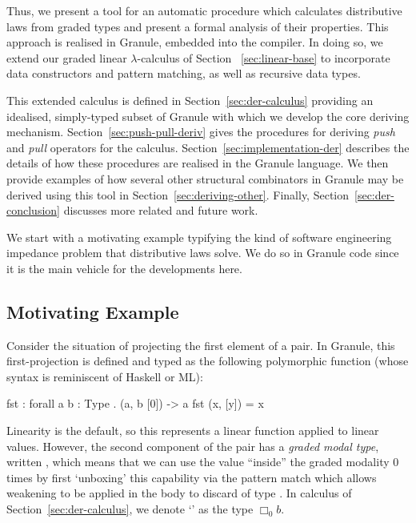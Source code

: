 Thus, we present a tool for an automatic procedure which calculates distributive
laws from graded types and present a formal analysis of their properties. This
approach is realised in Granule, embedded into the compiler. In doing so, we 
extend our graded linear $\lambda$-calculus of Section
~\ref{sec:linear-base} to incorporate data constructors and pattern matching, as well 
as recursive data types. 

This extended calculus is defined in Section~\ref{sec:der-calculus}
providing an idealised, simply-typed subset of Granule with which we develop the
core deriving mechanism. Section~\ref{sec:push-pull-deriv} gives the procedures for
deriving \emph{push} and \emph{pull} operators for the calculus.
Section~\ref{sec:implementation-der} describes the details of how these procedures
are realised in the Granule language. We then provide examples of how several
other structural combinators in Granule may be derived using this tool in
Section~\ref{sec:deriving-other}. Finally, Section~\ref{sec:der-conclusion}
discusses more related and future work.

We start with a motivating example typifying the kind of software engineering
impedance problem that distributive laws solve. We do so in Granule code since
it is the main vehicle for the developments here.

\subsection{Motivating Example}
\label{sec:motivating-example}

Consider the situation of projecting the first element of a pair. In Granule,
this first-projection is defined and typed as the following polymorphic function
(whose syntax is reminiscent of Haskell or ML):
%
\begin{granule}
fst : forall { a b : Type } . (a, b [0]) -> a
fst (x, [y]) = x
\end{granule}
%
Linearity is the default, so this represents a linear function applied to linear
values. However, the second component of the pair has a \emph{graded modal
type}, written , which means that we can use the value ``inside''
the graded modality $0$ times by first `unboxing' this capability via the
pattern match \granin{[y]} which allows weakening to be applied in the body to
discard  of type . In calculus of
Section~\ref{sec:der-calculus}, we denote `' as the type
$\Box_0 b$.

